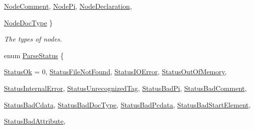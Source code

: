 \begin{DoxyCompactItemize}
\hyperlink{namespacephys_1_1xml_a668b0cc666a9d49f7c7222a7552115d3a25b778cb61ae0a9f15590cad5e0120d2}{NodeComment}, 
\hyperlink{namespacephys_1_1xml_a668b0cc666a9d49f7c7222a7552115d3a3c09d11be0cea840f23f55e084cf72fa}{NodePi}, 
\hyperlink{namespacephys_1_1xml_a668b0cc666a9d49f7c7222a7552115d3a1e3789aa995b7bf563ca8c43553ac035}{NodeDeclaration}, 
\par
\hyperlink{namespacephys_1_1xml_a668b0cc666a9d49f7c7222a7552115d3aca750034b7e4a34d53cfd3399b2bcd99}{NodeDocType}
 \}
\begin{DoxyCompactList}\small\item\em The types of nodes. \item\end{DoxyCompactList}\item 
enum \hyperlink{namespacephys_1_1xml_ae7aabb879b21c73d8183a54470f8917f}{ParseStatus} \{ \par
\hyperlink{namespacephys_1_1xml_ae7aabb879b21c73d8183a54470f8917fa9ea9b3eecb4bb9f01745c94150982560}{StatusOk} =  0, 
\hyperlink{namespacephys_1_1xml_ae7aabb879b21c73d8183a54470f8917fa6f0279c8ce0103b77edcf3ce91fa64b4}{StatusFileNotFound}, 
\hyperlink{namespacephys_1_1xml_ae7aabb879b21c73d8183a54470f8917fa63f6d040311f50c1234a8eb873a0a95c}{StatusIOError}, 
\hyperlink{namespacephys_1_1xml_ae7aabb879b21c73d8183a54470f8917fac2a8163c9a8e285153d2a96b011bd49f}{StatusOutOfMemory}, 
\par
\hyperlink{namespacephys_1_1xml_ae7aabb879b21c73d8183a54470f8917fa458daab0a01f8dd3d0d85b4e41b9e187}{StatusInternalError}, 
\hyperlink{namespacephys_1_1xml_ae7aabb879b21c73d8183a54470f8917fabe0f4590debfa56c7e3a4c8da261b106}{StatusUnrecognizedTag}, 
\hyperlink{namespacephys_1_1xml_ae7aabb879b21c73d8183a54470f8917fa55afc9de133574f5c9376493c8e6fe09}{StatusBadPi}, 
\hyperlink{namespacephys_1_1xml_ae7aabb879b21c73d8183a54470f8917fa8f3864efd7b684ae57a8a7886a23f19a}{StatusBadComment}, 
\par
\hyperlink{namespacephys_1_1xml_ae7aabb879b21c73d8183a54470f8917fa18f36b8d712a6bbc716f90af8659df22}{StatusBadCdata}, 
\hyperlink{namespacephys_1_1xml_ae7aabb879b21c73d8183a54470f8917fa8fb41bcdb73615156e9a031fa4c5db4f}{StatusBadDocType}, 
\hyperlink{namespacephys_1_1xml_ae7aabb879b21c73d8183a54470f8917fab30b3a432145b0e9c6595e75da773628}{StatusBadPcdata}, 
\hyperlink{namespacephys_1_1xml_ae7aabb879b21c73d8183a54470f8917fadbc5b334b4215ce2332073de46c58155}{StatusBadStartElement}, 
\par
\hyperlink{namespacephys_1_1xml_ae7aabb879b21c73d8183a54470f8917fac5fdddc5cc4d127aa5c53efb85846ccf}{StatusBadAttribute}, 

\end{DoxyCompactItemize}
